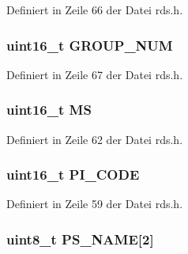 Definiert in Zeile 66 der Datei rds.\+h.

\hypertarget{structgroup__0a_a9f692e9f76ee88348d426bcd4e9bc70b}{}
\subsubsection[{G\+R\+O\+U\+P\+\_\+\+N\+U\+M}]{\setlength{\rightskip}{0pt plus 5cm}uint16\+\_\+t G\+R\+O\+U\+P\+\_\+\+N\+U\+M}\label{structgroup__0a_a9f692e9f76ee88348d426bcd4e9bc70b}


Definiert in Zeile 67 der Datei rds.\+h.

\hypertarget{structgroup__0a_a0d87191040df43fdd9f67487d0cc1a45}{}
\subsubsection[{M\+S}]{\setlength{\rightskip}{0pt plus 5cm}uint16\+\_\+t M\+S}\label{structgroup__0a_a0d87191040df43fdd9f67487d0cc1a45}


Definiert in Zeile 62 der Datei rds.\+h.

\hypertarget{structgroup__0a_a5cd9b1f6413028425796c1129aa8fd87}{}
\subsubsection[{P\+I\+\_\+\+C\+O\+D\+E}]{\setlength{\rightskip}{0pt plus 5cm}uint16\+\_\+t P\+I\+\_\+\+C\+O\+D\+E}\label{structgroup__0a_a5cd9b1f6413028425796c1129aa8fd87}


Definiert in Zeile 59 der Datei rds.\+h.

\hypertarget{structgroup__0a_a80447425671c19133df16d620705bb09}{}
\subsubsection[{P\+S\+\_\+\+N\+A\+M\+E}]{\setlength{\rightskip}{0pt plus 5cm}uint8\+\_\+t P\+S\+\_\+\+N\+A\+M\+E\mbox{[}2\mbox{]}}\label{structgroup__0a_a80447425671c19133df16d620705bb09}


